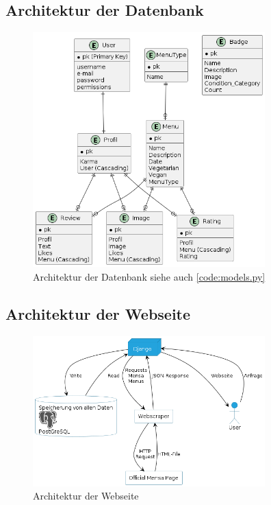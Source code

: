 \subsection{Architektur der Datenbank}
\begin{figure}[ht]
    \centering
    \includegraphics[width=0.8\textwidth]{images/Database.png}
    \caption{Architektur der Datenbank siehe auch \ref{code:models.py}}
    \label{fig:DB}
\end{figure}

\subsection{Architektur der Webseite}
\begin{figure}[ht]
    \centering
    \includegraphics[width=0.8\textwidth]{images/Webseite.png}
    \caption{Architektur der Webseite}
    \label{fig:Website}
\end{figure}

